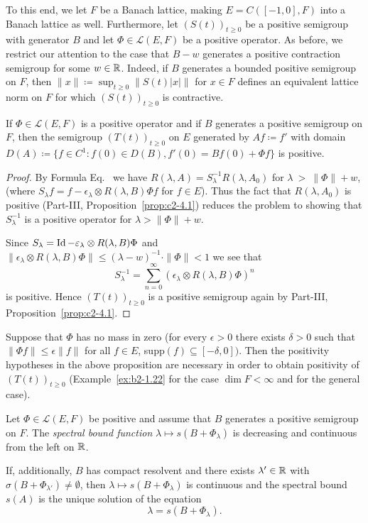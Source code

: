 To this end, we let $F$ be a Banach lattice, making $E = C([-1,0],F)$ into a Banach lattice as well. 
Furthermore, let $(S(t))_{t \geq 0}$ be a positive semigroup with generator $B$ and let $\Phi \in \mathcal{L}(E,F)$ be a positive operator. 
As before, we restrict our attention to the case that $B - w$ generates a positive contraction semigroup for some $w \in \mathbb{R}$. 
Indeed, if\/ $B$ generates a bounded positive semigroup on $F$, then $\|x\|  \coloneq  \sup_{t \geq 0}\|S(t)|x|\|$ for $x \in F$ defines an equivalent lattice norm on $F$ for which $(S(t))_{t \geq 0}$ is contractive.
\begin{proposition}\label{prop:b4-3.5}
	If\/ $\Phi \in \mathcal{L}(E,F)$ is a positive operator and if\/ $B$ generates a positive semigroup on $F$, then the semigroup $(T(t))_{t \geq 0}$ on $E$ generated by $Af  \coloneq  f'$ with domain $D(A)  \coloneq  \{f \in C^1 \colon f(0) \in D(B), f'(0) = Bf(0) + \Phi f\}$ is positive.
\end{proposition}
\begin{proof} By Formula Eq.~ we have $R(\lambda,A) = S_\lambda^{-1}R(\lambda,A_{0})$ for $\lambda~>~\|\Phi\|+w$, (where $S_\lambda f = f - \epsilon_\lambda \otimes R(\lambda,B)\Phi f$ for $f \in E$). 
Thus the fact that $R(\lambda,A_{0})$ is positive (Part-III, Proposition~\ref{prop:c2-4.1}) reduces the problem to showing that $S_\lambda^{-1}$ is a positive operator for $\lambda > \|\Phi\|+w$.

Since $S_\lambda = \Id  - \epsilon_\lambda \otimes R(\lambda,B)\Phi$ and $\|\epsilon_\lambda \otimes R(\lambda,B)\Phi\| \leq (\lambda-w)^{-1} \cdot \|\Phi\| < 1$ we see that 
\[
S_\lambda^{-1} = \sum_{n=0}^{\infty}(\epsilon_\lambda \otimes R(\lambda,B)\Phi)^n
\]
is positive. 
Hence $(T(t))_{t \geq 0}$ is a positive semigroup again by Part-III, Proposition~\ref{prop:c2-4.1}.
\end{proof}
\begin{remark*}
Suppose that $\Phi$ has no mass in zero (\ie  for every $\epsilon > 0$ there exists $\delta > 0$ such that $\|\Phi f\| \leq \epsilon \|f\|$ for all $f \in E$, supp$(f) \subseteq [-\delta,0])$. 
Then the positivity hypotheses in the above proposition are necessary in order to obtain positivity of\/ $(T(t))_{t \geq 0}$ (\cf Example~\ref{ex:b2-1.22} for the case $\dim F < \infty$ and \textcite{kerscher:1986} for the general case).
\end{remark*}
\begin{proposition}\label{prop:b4-3.6}
	Let $\Phi \in \mathcal{L}(E,F)$ be positive and assume that $B$ generates a positive semigroup on $F$. 
    The \emph{spectral bound function} $\lambda \mapsto s(B + \Phi_\lambda)$ is decreasing and continuous from the left on $\mathbb{R}$.
	
	If, additionally, $B$ has compact resolvent and there exists $\lambda' \in \mathbb{R}$ with $\sigma(B + \Phi_{\lambda'}) \neq \emptyset$, then $\lambda \mapsto s(B + \Phi_\lambda)$ is continuous and the spectral bound $s(A)$ is the unique solution of the equation
	\begin{equation}\label{eq:b4-3.5}
		\lambda = s(B + \Phi_\lambda) .
	\end{equation}
\end{proposition}

